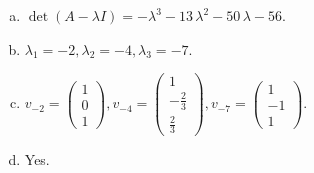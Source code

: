 \begin{questions}
\begin{solution}
\begin{enumerate}[(a)]
\item $\det(A-\lambda I)=-{\lambda}^{3} - 13 \, {\lambda}^{2} - 50 \, {\lambda} - 56$.
\item ${\lambda}_1=-2, {\lambda}_2=-4, {\lambda}_3=-7$.
\item $v_{-2}=\left(\begin{array}{r}
1 \\
0 \\
1
\end{array}\right), v_{-4}=\left(\begin{array}{r}
1 \\
-\frac{2}{3} \\
\frac{2}{3}
\end{array}\right), v_{-7}=\left(\begin{array}{r}
1 \\
-1 \\
1
\end{array}\right)$.
\item Yes.
\end{enumerate}
\end{solution}

\end{questions}

\newpage


\begin{center}
\end{center}

